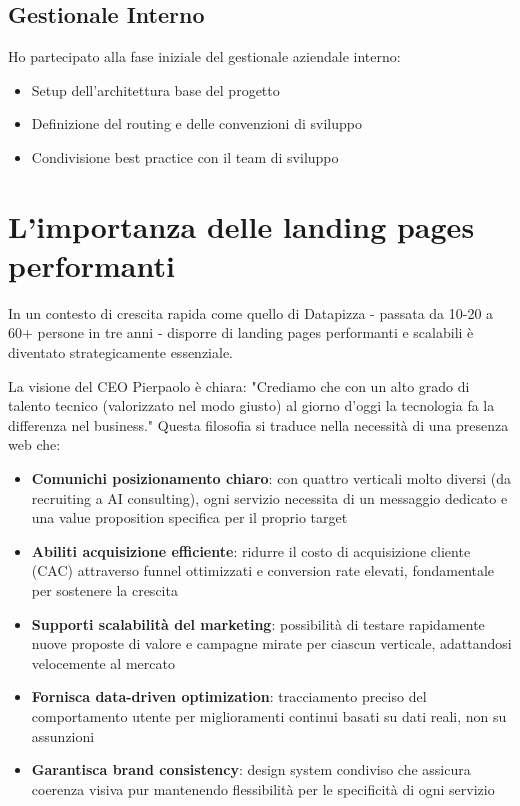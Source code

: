 \subsection{Gestionale Interno}
Ho partecipato alla fase iniziale del gestionale aziendale interno:
\begin{itemize}
  \item Setup dell'architettura base del progetto
  \item Definizione del routing e delle convenzioni di sviluppo
  \item Condivisione best practice con il team di sviluppo
\end{itemize}

\section{L'importanza delle landing pages performanti}
In un contesto di crescita rapida come quello di Datapizza - passata da 10-20 a 60+ persone in tre anni - disporre di landing pages performanti e scalabili è diventato strategicamente essenziale.

La visione del CEO Pierpaolo è chiara: "Crediamo che con un alto grado di talento tecnico (valorizzato nel modo giusto) al giorno d'oggi la tecnologia fa la differenza nel business." Questa filosofia si traduce nella necessità di una presenza web che:

\begin{itemize}
  \item \textbf{Comunichi posizionamento chiaro}: con quattro verticali molto diversi (da recruiting a AI consulting), ogni servizio necessita di un messaggio dedicato e una value proposition specifica per il proprio target
  
  \item \textbf{Abiliti acquisizione efficiente}: ridurre il costo di acquisizione cliente (CAC) attraverso funnel ottimizzati e conversion rate elevati, fondamentale per sostenere la crescita
  
  \item \textbf{Supporti scalabilità del marketing}: possibilità di testare rapidamente nuove proposte di valore e campagne mirate per ciascun verticale, adattandosi velocemente al mercato
  
  \item \textbf{Fornisca data-driven optimization}: tracciamento preciso del comportamento utente per miglioramenti continui basati su dati reali, non su assunzioni
  
  \item \textbf{Garantisca brand consistency}: design system condiviso che assicura coerenza visiva pur mantenendo flessibilità per le specificità di ogni servizio
\end{itemize}

